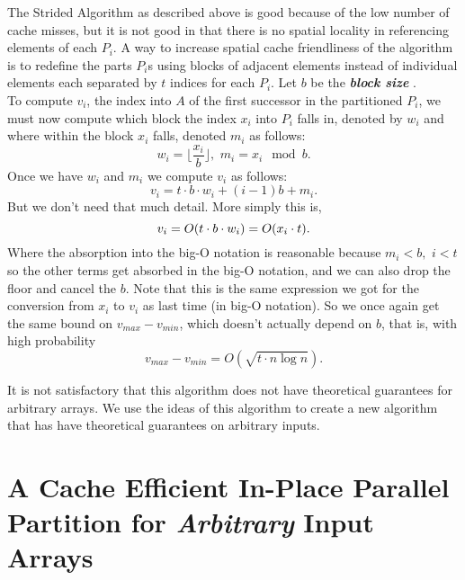 \documentclass[11pt]{article}
\DeclarePairedDelimiter{\paren}{(}{)}
\newcommand{\defn}[1]{{\textit{\textbf{\boldmath #1}}} }
\renewcommand{\paragraph}[1]{\vspace{0.09in}\noindent{\bf \boldmath #1.}}
\theoremstyle{remark}
\theoremstyle{remark}
\begin{document}
\paragraph{Spatial locality}
The Strided Algorithm as described above is good because of the low number of
cache misses, but it is not good in that there is no spatial locality in
referencing elements of each $P_i$.  A way to increase spatial cache
friendliness of the algorithm is to redefine the parts $P_i$s using blocks of
adjacent elements instead of individual elements each separated by $t$ indices
for each $P_i$.  Let $b$ be the \defn{block size}. \\ To compute $v_i$, the
index into $A$ of the first successor in the partitioned $P_i$, we must now
compute which block the index $x_i$ into $P_i$ falls in, denoted by $w_i$ and
where within the block $x_i$ falls, denoted $m_i$ as follows: $$w_i =
\Big\lfloor \frac{x_i}{b} \Big\rfloor,\,\, m_i=x_i \mod b.$$ Once we have $w_i$
and $m_i$ we compute $v_i$ as follows: $$v_i = t\cdot b\cdot w_i +
(i-1)b+m_i.$$ But we don't need that much detail.  More simply this is, $$v_i =
O(t\cdot b \cdot w_i) = O\paren*{x_i\cdot t}.$$ Where the absorption into the
big-O notation is reasonable because $m_i < b,\,\, i<t$ so the other terms get
absorbed in the big-O notation, and we can also drop the floor and cancel the
$b$.  Note that this is the same expression we got for the conversion from
$x_i$ to $v_i$ as last time (in big-O notation).  So we once again get the same
bound on $v_{max}-v_{min}$, which doesn't actually depend on $b$, that is, with
high probability $$v_{max}-v_{min} = O(\sqrt{t\cdot n\log n}).$$

\paragraph{Summary} It is not satisfactory that this algorithm does not have
theoretical guarantees for arbitrary arrays.  We use the ideas of this
algorithm to create a new algorithm that has have theoretical guarantees on
arbitrary inputs.



\section{A Cache Efficient In-Place Parallel Partition for \emph{Arbitrary} Input Arrays}\label{sec:smoothing}
\end{document}
